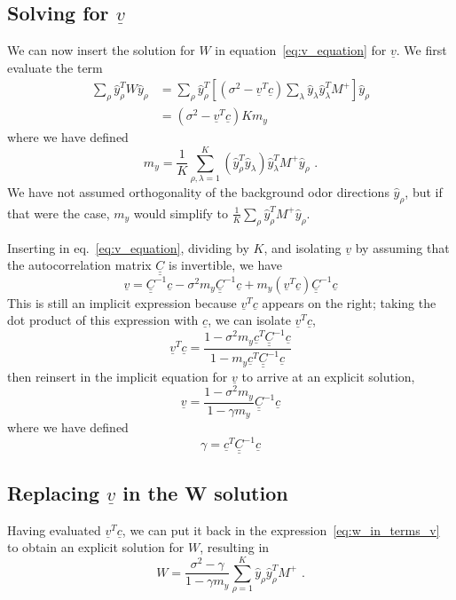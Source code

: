 \documentclass[letter, 12pt]{article}
\def\beq{ \begin{equation} }		%
\def\eeq{ \end{equation} } 			%
\newcommand{\dul}[1]{\underline{\underline{#1}}}
\begin{document}
\subsection{Solving for $\underline{v}$}
We can now insert the solution for $W$ in equation~\ref{eq:v_equation} for $\underline{v}$. We first evaluate the term
\begin{align*}
	\sum_{\rho} \hat{y}_{\rho}^T W \hat{y}_{\rho} &= \sum_{\rho} \hat{y}_{\rho}^T \left[(\sigma^2 - \underline{v}^T\underline{c}) \sum_{\lambda} \hat{y}_{\lambda} \hat{y}_{\lambda}^T M^+ \right] \hat{y}_{\rho} \\
	&= (\sigma^2 - \underline{v}^T \underline{c}) K m_y
\end{align*}
where we have defined
\beq
	m_y = \frac{1}{K} \sum_{\rho, \lambda=1}^K (\hat{y}_{\rho}^T \hat{y}_{\lambda}) \hat{y}_{\lambda}^T M^+ \hat{y}_{\rho} \,\, .
	\label{eq:m_y_def}
\eeq
We have not assumed orthogonality of the background odor directions $\hat{y}_{\rho}$, but if that were the case, $m_y$ would simplify to $\frac1K \sum_{\rho} \hat{y}_{\rho}^T M^+ \hat{y}_{\rho}$. 

Inserting in eq.~\eqref{eq:v_equation}, dividing by $K$, and isolating $\underline{v}$ by assuming that the autocorrelation matrix $\dul{C}$ is invertible, we have
\begin{equation*}
	\underline{v} = \dul{C}^{-1} \underline{c} - \sigma^2 m_y \dul{C}^{-1} \underline{c} + m_y (\underline{v}^T \underline{c}) \dul{C}^{-1} \underline{c}
\end{equation*}
This is still an implicit expression because $\underline{v}^T \underline{c}$ appears on the right; taking the dot product of this expression with $\underline{c}$, we can isolate $\underline{v}^T \underline{c}$, 
\begin{equation*}
	\underline{v}^T \underline{c} = \frac{1 - \sigma^2 m_y \underline{c}^T \dul{C}^{-1} \underline{c}}{1 - m_y \underline{c}^T \dul{C}^{-1} \underline{c}}
\end{equation*}
then reinsert in the implicit equation for $\underline{v}$ to arrive at an explicit solution, 
\beq
	\underline{v} = \frac{1 - \sigma^2 m_y }{1 - \gamma m_y} \dul{C}^{-1} \underline{c}
	\label{eq:v_solution}
\eeq
where we have defined
\beq
	\gamma = \underline{c}^T \dul{C}^{-1} \underline{c}
	\label{eq:gamma_def}
\eeq


\subsection{Replacing $\underline{v}$ in the W solution}
Having evaluated $\underline{v}^T \underline{c}$, we can put it back in the expression~\eqref{eq:w_in_terms_v} to obtain an explicit solution for $W$, resulting in
\beq
	W = \frac{\sigma^2 - \gamma}{1 - \gamma m_y} \sum_{\rho=1}^K \hat{y}_{\rho} \hat{y}_{\rho}^T M^+ \,\, .
	\label{eq:w_solution}
\eeq
\end{document}
